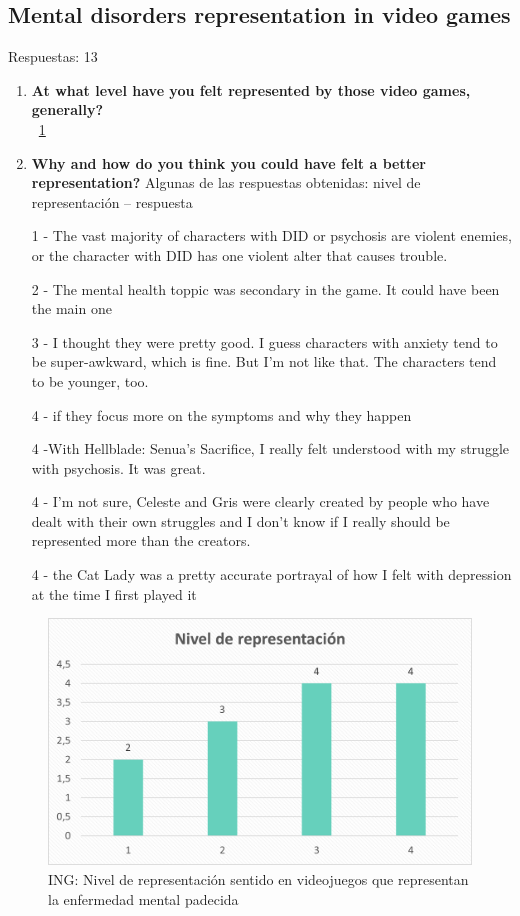 \documentclass[12pt, a4paper,twoside,titlepage]{book}
\begin{document}
\subsection{Mental disorders representation in video games}
Respuestas: 13
\begin{enumerate}[label=\textbf{\arabic*}.]
     \item \textbf{At what level have you felt represented by those video games, generally?}\\
    ~\ref{fig:INGNivel}
     \item \textbf{Why and how do you think you could have felt a better representation?}
     \label{representacionIngles}
     Algunas de las respuestas obtenidas: nivel de representación – respuesta
     
    1 - The vast majority of characters with DID or psychosis are violent enemies, or the character with DID has one violent alter that causes trouble.
    
    2 - The mental health toppic was secondary in the game. It could have been the main one
    
    3 - I thought they were pretty good. I guess characters with anxiety tend to be super-awkward, which is fine. But I'm not like that. The characters tend to be younger, too.
    
    4 - if they focus more on the symptoms and why they happen
    
    4 -With Hellblade: Senua's Sacrifice, I really felt understood with my struggle with psychosis. It was great.
    
    4 - I'm not sure, Celeste and Gris were clearly created by people who have dealt with their own struggles and I don't know if I really should be represented more than the creators.
    
    4 - the Cat Lady was a pretty accurate portrayal of how I felt with depression at the time I first played it

     
\end{enumerate}

\begin{figure}
    \centering
    \includegraphics[width=.8\linewidth]{ANEXO ING/26AnexINGNivel}
    \caption{ING: Nivel de representación sentido en videojuegos que representan la enfermedad mental padecida}
    \label{fig:INGNivel}
\end{figure}
\end{document}
